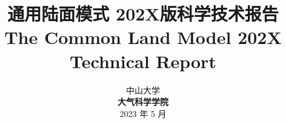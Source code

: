 \documentclass[a4paper,12pt,twoside]{report}
\begin{document}
%

\title{\huge {\bf 通用陆面模式 202X版科学技术报告}\\[3em]
\fontsize {22}{24}
\bf{ The Common Land Model 202X Technical Report }\\[3in]
\fontsize {20}{23}%
}

\author{
 \large{ 中山大学 }\\[0.1in]
 {\bf 大气科学学院}\\[1in]
 \upshape
 \large%
2023 年 5 月
}

\normallinespacing
\maketitle

\preface

%
%
%
%

\body



















\appendix
{}


\renewcommand{\bibname}{参考文献}


\end{document}

